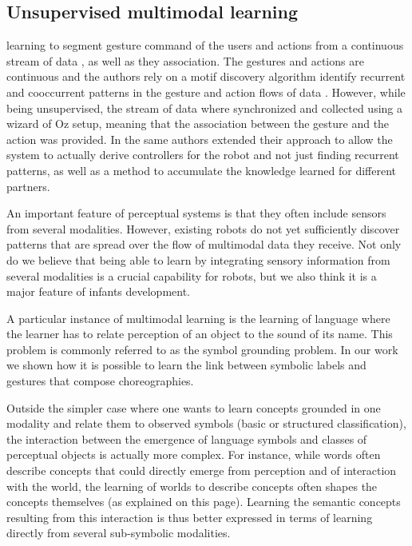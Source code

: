 \subsection{Unsupervised multimodal learning}


\cite{mohammad2009unsupervised} learning to segment gesture command of the users and actions from a continuous stream of data , as well as they association. The gestures and actions are continuous and the authors rely on a motif discovery algorithm identify recurrent  and cooccurrent patterns in the gesture and action flows of data \cite{mohammad2009constrained}. However, while being unsupervised, the stream of data where synchronized and collected using a wizard of Oz setup, meaning that the association between the gesture and the action was provided. In \cite{mohammad2010learning} the same authors extended their approach to allow the system to actually derive controllers for the robot and not just finding recurrent patterns, as well as a method to accumulate the knowledge learned for different partners.


\cite{mangin2012learning,mangin2013learning,mangin2014thesis}

 An important feature of perceptual systems is that they often include sensors from several modalities. However, existing robots do not yet sufficiently discover patterns that are spread over the flow of multimodal data they receive. Not only do we believe that being able to learn by integrating sensory information from several modalities is a crucial capability for robots, but we also think it is a major feature of infants development.

A particular instance of multimodal learning is the learning of language where the learner has to relate perception of an object to the sound of its name. This problem is commonly referred to as the symbol grounding problem. In our work we shown how it is possible to learn the link between symbolic labels and gestures that compose choreographies.

Outside the simpler case where one wants to learn concepts grounded in one modality and relate them to observed symbols (basic or structured classification), the interaction between the emergence of language symbols and classes of perceptual objects is actually more complex. For instance, while words often describe concepts that could directly emerge from perception and of interaction with the world, the learning of worlds to describe concepts often shapes the concepts themselves (as explained on this page). Learning the semantic concepts resulting from this interaction is thus better expressed in terms of learning directly from several sub-symbolic modalities. 

